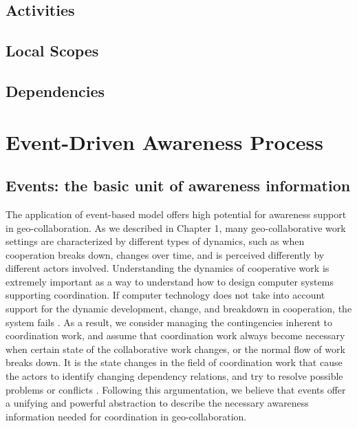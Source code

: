 \subsection{Activities} %
\label{sub:activities}


\subsection{Local Scopes} %
\label{sub:local_scopes}


\subsection{Dependencies} %
\label{sub:dependencies}



\section{Event-Driven Awareness Process}
\label{sec:event_driven_awareness_process}

\subsection{Events: the basic unit of awareness information} %
\label{sub:understanding_events}
The application of event-based model offers high potential for awareness support in geo-collaboration. As we described in Chapter 1, many geo-collaborative work settings are characterized by different types of dynamics, such as when cooperation breaks down, changes over time, and is perceived differently by different actors involved. Understanding the dynamics of cooperative work is extremely important as a way to understand how to design computer systems supporting coordination. If computer technology does not take into account support for the dynamic development, change, and breakdown in cooperation, the system fails \cite{bardram1998designing}. As a result, we consider managing the contingencies inherent to coordination work, and assume that coordination work always become necessary when certain state of the collaborative work changes, or the normal flow of work breaks down. It is the state changes in the field of coordination work that cause the actors to identify changing dependency relations, and try to resolve possible problems or conflicts \cite{symon1996coordination}. Following this argumentation, we believe that events offer a unifying and powerful abstraction to describe the necessary awareness information needed for coordination in geo-collaboration. 

